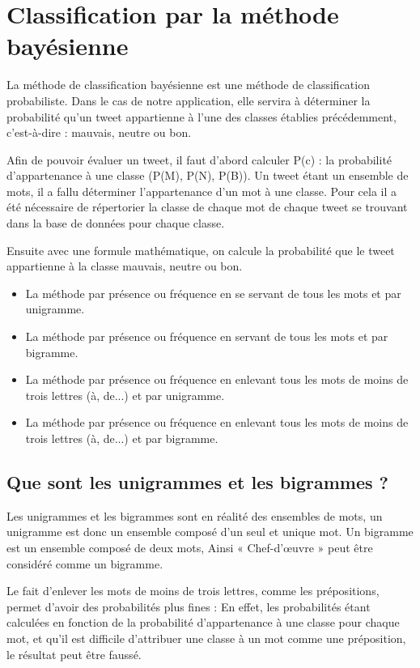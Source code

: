 \documentclass[12pt,a4paper]{report}
\begin{document}
\newpage
\section{Classification par la méthode bayésienne}
La méthode de classification bayésienne est une méthode de classification
probabiliste. Dans le cas de notre application, elle servira à déterminer la
probabilité qu'un tweet appartienne à l'une des classes établies précédemment,
c'est-à-dire : mauvais, neutre ou bon.

Afin de pouvoir évaluer un tweet, il faut d'abord calculer P(c) : la probabilité
d'appartenance à une classe (P(M), P(N), P(B)).
Un tweet étant un ensemble de mots, il a fallu déterminer l'appartenance d'un
mot à une classe. Pour cela il a été nécessaire de répertorier la classe de
chaque mot de chaque tweet se trouvant dans la base de données pour chaque
classe.

Ensuite avec une formule mathématique, on calcule la probabilité que le tweet
appartienne à la classe mauvais, neutre ou bon.

\begin{itemize}
    \item
        La méthode par présence ou fréquence en se servant de tous les mots et
        par unigramme.
    \item
        La méthode par présence ou fréquence en servant de tous les mots et par
        bigramme.
    \item
        La méthode par présence ou fréquence en enlevant tous les mots de moins
        de trois lettres (à, de...) et par unigramme.
    \item
        La méthode par présence ou fréquence en enlevant tous les mots de moins
        de trois lettres (à, de...) et par bigramme.
\end{itemize}

\subsection{Que sont les unigrammes et les bigrammes ?}
Les unigrammes et les bigrammes sont en réalité des ensembles de mots, un
unigramme est donc un ensemble composé d'un seul et unique mot. Un bigramme est
un ensemble composé de deux mots, Ainsi « Chef-d'œuvre » peut être considéré
comme un bigramme.

Le fait d'enlever les mots de moins de trois lettres, comme les prépositions,
permet d'avoir des probabilités plus fines : En effet, les probabilités étant
calculées en fonction de la probabilité d'appartenance à une classe pour chaque
mot, et qu'il est difficile d'attribuer une classe à un mot comme une
préposition, le résultat peut être faussé.
\end{document}
